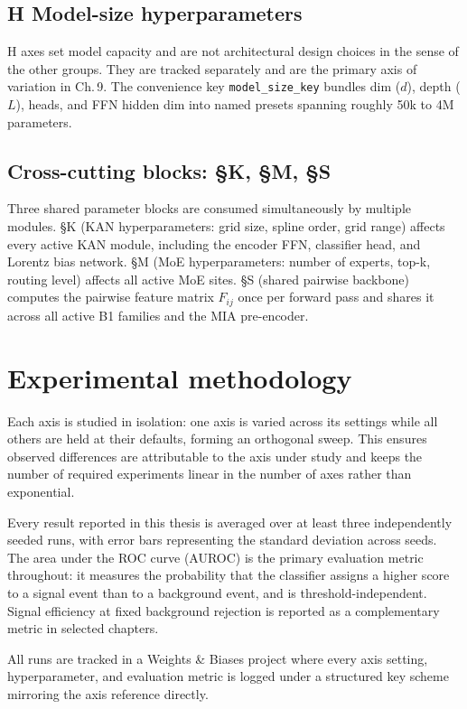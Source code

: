 \subsection*{H \quad Model-size hyperparameters}

H axes set model capacity and are not architectural design choices in
the sense of the other groups. They are tracked separately and are the
primary axis of variation in Ch.\,9. The convenience key
\texttt{model\_size\_key} bundles dim ($d$), depth ($L$), heads, and
FFN hidden dim into named presets spanning roughly 50k to 4M
parameters.

\subsection*{Cross-cutting blocks: §K, §M, §S}

Three shared parameter blocks are consumed simultaneously by multiple
modules. §K (KAN hyperparameters: grid size, spline order, grid range)
affects every active KAN module, including the encoder FFN, classifier
head, and Lorentz bias network. §M (MoE hyperparameters: number of
experts, top-k, routing level) affects all active MoE sites. §S (shared
pairwise backbone) computes the pairwise feature matrix $F_{ij}$ once
per forward pass and shares it across all active B1 families and the
MIA pre-encoder.

\section{Experimental methodology}

Each axis is studied in isolation: one axis is varied across its
settings while all others are held at their defaults, forming an
orthogonal sweep. This ensures observed differences are attributable to
the axis under study and keeps the number of required experiments
linear in the number of axes rather than exponential.

Every result reported in this thesis is averaged over at least three
independently seeded runs, with error bars representing the standard
deviation across seeds. The area under the ROC curve (AUROC) is the
primary evaluation metric throughout: it measures the probability that
the classifier assigns a higher score to a signal event than to a
background event, and is threshold-independent. Signal efficiency at
fixed background rejection is reported as a complementary metric in
selected chapters.

All runs are tracked in a Weights \& Biases project where every axis
setting, hyperparameter, and evaluation metric is logged under a
structured key scheme mirroring the axis reference directly.
